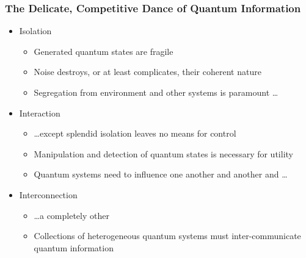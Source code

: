 
\begin{frame}
  \frametitle{The Delicate, Competitive Dance of Quantum Information}
  \begin{itemize}
  \item Isolation
    \begin{itemize}
    \item Generated quantum states are fragile
    \item Noise destroys, or at least complicates, their coherent nature
    \item Segregation from environment and other systems is paramount \ldots
    \end{itemize}

  \item Interaction
    \begin{itemize}
    \item \ldots except splendid isolation leaves no means for control
    \item Manipulation and detection of quantum states is necessary for
      utility
    \item Quantum systems need to influence one another and another
      and \ldots
    \end{itemize}

  \item Interconnection
    \begin{itemize}
    \item \ldots a completely other
    \item Collections of heterogeneous quantum systems must inter-communicate
      quantum information  
    \end{itemize}

  \end{itemize}
\end{frame}
